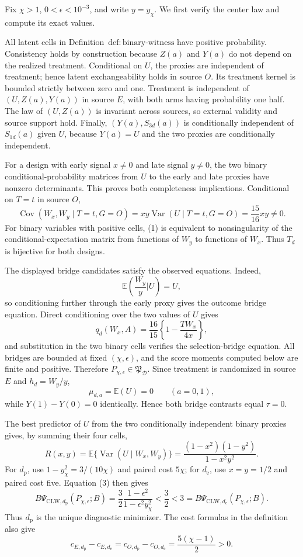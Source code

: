 Fix \(\chi>1\), \(0<\epsilon<10^{-3}\), and write \(y=y_\chi\).  We first verify the center law and compute its exact values.

All latent cells in Definition~\(\mathrm{def{:}binary\text{-}witness}\) have positive probability.  Consistency holds by construction because \(Z(a)\) and \(Y(a)\) do not depend on the realized treatment.  Conditional on \(U\), the proxies are independent of treatment; hence latent exchangeability holds in source \(O\).  Its treatment kernel is bounded strictly between zero and one.  Treatment is independent of \((U,Z(a),Y(a))\) in source \(E\), with both arms having probability one half.  The law of \((U,Z(a))\) is invariant across sources, so external validity and source support hold.  Finally, \((Y(a),S_{3d}(a))\) is conditionally independent of \(S_{1d}(a)\) given \(U\), because \(Y(a)=U\) and the two proxies are conditionally independent.

For a design with early signal \(x\ne0\) and late signal \(y\ne0\), the two binary conditional-probability matrices from \(U\) to the early and late proxies have nonzero determinants.  This proves both completeness implications.  Conditional on \(T=t\) in source \(O\),
\[
 \operatorname{Cov}(W_x,W_y\mid T=t,G=O)
 =xy\operatorname{Var}(U\mid T=t,G=O)
 =\frac{15}{16}xy\ne0.                                  \tag{1}
\]
For binary variables with positive cells, (1) is equivalent to nonsingularity of the conditional-expectation matrix from functions of \(W_y\) to functions of \(W_x\).  Thus \(T_d\) is bijective for both designs.

The displayed bridge candidates satisfy the observed equations.  Indeed,
\[
 \mathbb E\!\left(\frac{W_y}{y}\mathrel{\Big|}U\right)=U,
\]
so conditioning further through the early proxy gives the outcome bridge equation.  Direct conditioning over the two values of \(U\) gives
\[
 q_d(W_x,A)=\frac{16}{15}\left\{1-\frac{TW_x}{4x}\right\}, \tag{2}
\]
and substitution in the two binary cells verifies the selection-bridge equation.  All bridges are bounded at fixed \((\chi,\epsilon)\), and the score moments computed below are finite and positive.  Therefore \(P_{\chi,\epsilon}\in\mathfrak P_{\mathcal D}\).  Since treatment is randomized in source \(E\) and \(h_d=W_y/y\),
\[
 \mu_{d,a}=\mathbb E(U)=0
 \qquad(a=0,1),
\]
while \(Y(1)-Y(0)=0\) identically.  Hence both bridge contrasts equal \(\tau=0\).

The best predictor of \(U\) from the two conditionally independent binary proxies gives, by summing their four cells,
\[
 R(x,y)=\mathbb E\{\operatorname{Var}(U\mid W_x,W_y)\}
 =\frac{(1-x^2)(1-y^2)}{1-x^2y^2}.                       \tag{3}
\]
For \(d_{\mathrm p}\), use \(1-y_\chi^2=3/(10\chi)\) and paired cost \(5\chi\); for \(d_{\mathrm e}\), use \(x=y=1/2\) and paired cost five.  Equation (3) then gives
\[
 B\Psi_{\mathrm{CLW},d_{\mathrm p}}(P_{\chi,\epsilon};B)
 =\frac32\frac{1-\epsilon^2}{1-\epsilon^2y_\chi^2}
 <\frac32<3
 =B\Psi_{\mathrm{CLW},d_{\mathrm e}}(P_{\chi,\epsilon};B). \tag{4}
\]
Thus \(d_{\mathrm p}\) is the unique diagnostic minimizer.  The cost formulas in the definition also give
\[
 c_{E,d_{\mathrm p}}-c_{E,d_{\mathrm e}}
 =c_{O,d_{\mathrm p}}-c_{O,d_{\mathrm e}}
 =\frac{5(\chi-1)}2>0.                                  \tag{5}
\]

